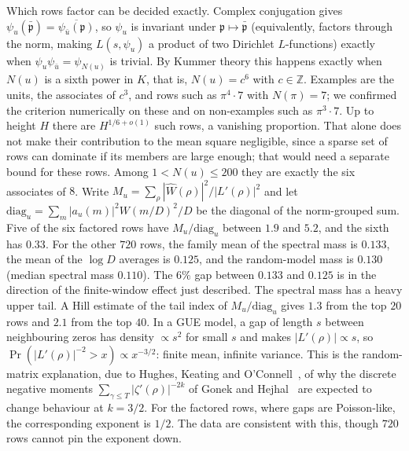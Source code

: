 \documentclass[11pt]{article}
\theoremstyle{remark}
\begin{document}
Which rows factor can be decided exactly. Complex conjugation gives
$\psi_u(\bar{\mathfrak p})=\overline{\psi_{\bar u}(\mathfrak p)}$, so $\psi_u$ is invariant under
$\mathfrak p\mapsto\bar{\mathfrak p}$ (equivalently, factors through the norm, making
$L(s,\psi_u)$ a product of two Dirichlet $L$-functions) exactly when
$\psi_u\psi_{\bar u}=\psi_{N(u)}$ is trivial. By Kummer theory this happens exactly when $N(u)$
is a sixth power in $K$, that is, $N(u)=c^6$ with $c\in\mathbb Z$. Examples are the units, the
associates of $c^3$, and rows such as $\pi^4\cdot7$ with $N(\pi)=7$; we confirmed the criterion
numerically on these and on non-examples such as $\pi^3\cdot7$. Up to height $H$ there are
$H^{1/6+o(1)}$ such rows, a vanishing proportion. That alone does not make their contribution
to the mean square negligible, since a sparse set of rows can dominate if its members are
large enough; that would need a separate bound for these rows. Among
$1<N(u)\le200$ they are exactly the six associates of $8$. Write
$M_u=\sum_\rho|\widehat W(\rho)|^2/|L'(\rho)|^2$ and let
$\mathrm{diag}_u=\sum_m|a_u(m)|^2W(m/D)^2/D$ be the diagonal of the norm-grouped sum. Five
of the six factored rows have $M_u/\mathrm{diag}_u$ between $1.9$ and $5.2$, and the sixth
has $0.33$. For the other $720$ rows, the family mean of the spectral mass is $0.133$, the mean
of the $\log D$ averages is $0.125$, and the random-model mass is $0.130$ (median spectral mass
$0.110$). The $6\%$ gap between $0.133$ and $0.125$ is in the direction of the finite-window
effect just described. The spectral mass has a heavy upper tail. A Hill estimate of the tail
index of $M_u/\mathrm{diag}_u$ gives $1.3$ from the top $20$ rows and $2.1$ from the top $40$. In a GUE model, a gap of length $s$ between neighbouring zeros has
density $\propto s^2$ for small $s$ and makes $|L'(\rho)|\propto s$, so
$\Pr(|L'(\rho)|^{-2}>x)\propto x^{-3/2}$: finite mean, infinite variance. This is the
random-matrix explanation, due to Hughes, Keating and O'Connell~\cite{HKO}, of why the discrete
negative moments $\sum_{\gamma\le T}|\zeta'(\rho)|^{-2k}$ of Gonek and Hejhal~\cite{Gonek} are
expected to change behaviour at $k=3/2$. For the factored rows, where gaps are Poisson-like, the
corresponding exponent is $1/2$. The data are consistent with this, though $720$ rows cannot pin
the exponent down.
\end{document}

